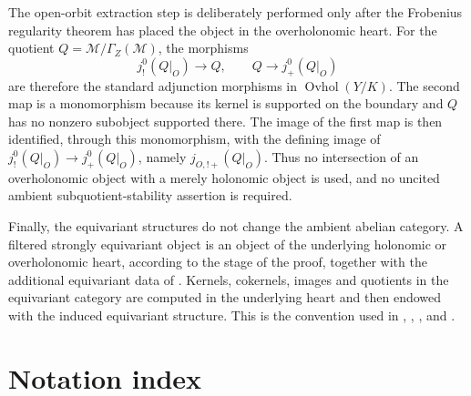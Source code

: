 \documentclass[11pt]{amsart}
\theoremstyle{plain}
\theoremstyle{definition}
\theoremstyle{remark}
\newcommand{\Ovhol}{\operatorname{Ovhol}}
\begin{document}
The open-orbit extraction step is deliberately performed only after the
Frobenius regularity theorem has placed the object in the overholonomic heart.
For the quotient \(Q=\mathcal M/\Gamma_Z(\mathcal M)\), the morphisms
\[
  j^0_!(Q|_O)\longrightarrow Q,
  \qquad
  Q\longrightarrow j^0_+(Q|_O)
\]
are therefore the standard adjunction morphisms in \(\Ovhol(Y/K)\).  The second
map is a monomorphism because its kernel is supported on the boundary and
\(Q\) has no nonzero subobject supported there.  The image of the first map is
then identified, through this monomorphism, with the defining image of
\(j^0_!(Q|_O)\to j^0_+(Q|_O)\), namely \(j_{O,!+}(Q|_O)\).  Thus no intersection
of an overholonomic object with a merely holonomic object is used, and no
uncited ambient subquotient-stability assertion is required.

Finally, the equivariant structures do not change the ambient abelian category.
A filtered strongly equivariant object is an object of the underlying holonomic or
overholonomic heart, according to the stage of the proof, together with the
additional equivariant data of .  Kernels,
cokernels, images and quotients in the equivariant category are computed in the
underlying heart and then endowed with the induced equivariant structure.  This
is the convention used in ,
,
, and
.


\section*{Notation index}
\end{document}
